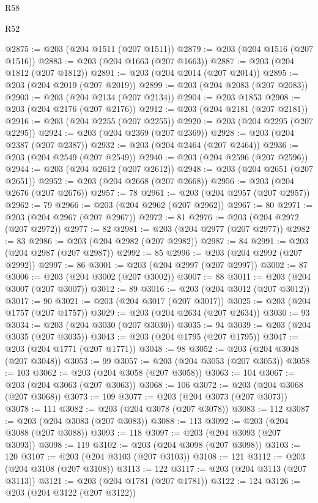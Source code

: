 \begin{lexlean}{R58}
\begin{lexlean}{R52}
\begin{coremodule}
{{{{{{{{{{{{{{{{{{{{{{{{{{{{{{{{{{{{{{{{{{{{{{{{{{{{{{{{{{{{{{{{{{{{{{{{{{{{{{{{{{{{{{{{{{{{{{{{{{{{{{{{{{{{{{{{{{{{{{{{{{{{{{{{{{{{{{{{{{{{{{{{{{{{{{{{{{{{{{{{{{{{{{{{{{{{{{{{{{{{{{{{{{{{{{{{{{{{{{@2875 := @203 (@204 @1511 (@207 @1511))
@2879 := @203 (@204 @1516 (@207 @1516))
@2883 := @203 (@204 @1663 (@207 @1663))
@2887 := @203 (@204 @1812 (@207 @1812))
@2891 := @203 (@204 @2014 (@207 @2014))
@2895 := @203 (@204 @2019 (@207 @2019))
@2899 := @203 (@204 @2083 (@207 @2083))
@2903 := @203 (@204 @2134 (@207 @2134))
@2904 := @203 @1853
@2908 := @203 (@204 @2176 (@207 @2176))
@2912 := @203 (@204 @2181 (@207 @2181))
@2916 := @203 (@204 @2255 (@207 @2255))
@2920 := @203 (@204 @2295 (@207 @2295))
@2924 := @203 (@204 @2369 (@207 @2369))
@2928 := @203 (@204 @2387 (@207 @2387))
@2932 := @203 (@204 @2464 (@207 @2464))
@2936 := @203 (@204 @2549 (@207 @2549))
@2940 := @203 (@204 @2596 (@207 @2596))
@2944 := @203 (@204 @2612 (@207 @2612))
@2948 := @203 (@204 @2651 (@207 @2651))
@2952 := @203 (@204 @2668 (@207 @2668))
@2956 := @203 (@204 @2676 (@207 @2676))
@2957 := 78
@2961 := @203 (@204 @2957 (@207 @2957))
@2962 := 79
@2966 := @203 (@204 @2962 (@207 @2962))
@2967 := 80
@2971 := @203 (@204 @2967 (@207 @2967))
@2972 := 81
@2976 := @203 (@204 @2972 (@207 @2972))
@2977 := 82
@2981 := @203 (@204 @2977 (@207 @2977))
@2982 := 83
@2986 := @203 (@204 @2982 (@207 @2982))
@2987 := 84
@2991 := @203 (@204 @2987 (@207 @2987))
@2992 := 85
@2996 := @203 (@204 @2992 (@207 @2992))
@2997 := 86
@3001 := @203 (@204 @2997 (@207 @2997))
@3002 := 87
@3006 := @203 (@204 @3002 (@207 @3002))
@3007 := 88
@3011 := @203 (@204 @3007 (@207 @3007))
@3012 := 89
@3016 := @203 (@204 @3012 (@207 @3012))
@3017 := 90
@3021 := @203 (@204 @3017 (@207 @3017))
@3025 := @203 (@204 @1757 (@207 @1757))
@3029 := @203 (@204 @2634 (@207 @2634))
@3030 := 93
@3034 := @203 (@204 @3030 (@207 @3030))
@3035 := 94
@3039 := @203 (@204 @3035 (@207 @3035))
@3043 := @203 (@204 @1795 (@207 @1795))
@3047 := @203 (@204 @1771 (@207 @1771))
@3048 := 98
@3052 := @203 (@204 @3048 (@207 @3048))
@3053 := 99
@3057 := @203 (@204 @3053 (@207 @3053))
@3058 := 103
@3062 := @203 (@204 @3058 (@207 @3058))
@3063 := 104
@3067 := @203 (@204 @3063 (@207 @3063))
@3068 := 106
@3072 := @203 (@204 @3068 (@207 @3068))
@3073 := 109
@3077 := @203 (@204 @3073 (@207 @3073))
@3078 := 111
@3082 := @203 (@204 @3078 (@207 @3078))
@3083 := 112
@3087 := @203 (@204 @3083 (@207 @3083))
@3088 := 113
@3092 := @203 (@204 @3088 (@207 @3088))
@3093 := 118
@3097 := @203 (@204 @3093 (@207 @3093))
@3098 := 119
@3102 := @203 (@204 @3098 (@207 @3098))
@3103 := 120
@3107 := @203 (@204 @3103 (@207 @3103))
@3108 := 121
@3112 := @203 (@204 @3108 (@207 @3108))
@3113 := 122
@3117 := @203 (@204 @3113 (@207 @3113))
@3121 := @203 (@204 @1781 (@207 @1781))
@3122 := 124
@3126 := @203 (@204 @3122 (@207 @3122))
}}}}}}}}}}}}}}}}}}}}}}}}}}}}}}}}}}}}}}}}}}}}}}}}}}}}}}}}}}}}}}}}}}}}}}}}}}}}}}}}}}}}}}}}}}}}}}}}}}}}}}}}}}}}}}}}}}}}}}}}}}}}}}}}}}}}}}}}}}}}}}}}}}}}}}}}}}}}}}}}}}}}}}}}}}}}}}}}}}}}}}}}}}}}}}}}}}}}}}
\end{coremodule}
\end{lexlean}
\end{lexlean}

